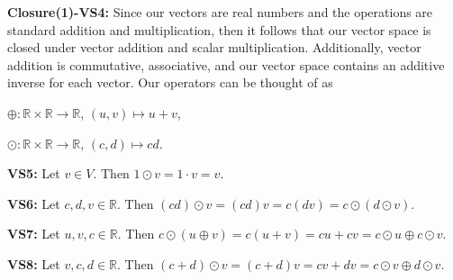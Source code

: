 \documentclass[12pt, a4paper]{article}
\begin{document}
\begin{description}

\item\textbf{Closure(1)-VS4: }Since our vectors are real numbers and the operations are standard addition and multiplication, then it follows that our vector space is closed under vector addition and scalar multiplication. Additionally, vector addition is commutative, associative, and our vector space contains an additive inverse for each vector. Our operators can be thought of as\par

\vspace{2mm}

\centerline{$\oplus\colon\mathbb{R}\times\mathbb{R}\rightarrow\mathbb{R}$, $(u,v)\mapsto u+v$,}

\vspace{2mm}

\centerline{$\odot\colon\mathbb{R}\times\mathbb{R}\rightarrow\mathbb{R}$, $(c,d)\mapsto cd$.}

\item\textbf{VS5:} Let $v\in V$. Then $1\odot v= 1\cdot v=v$.

\item\textbf{VS6:} Let $c,d,v\in\mathbb{R}$. Then $(cd)\odot v=(cd) v=c(dv)=c\odot(d\odot v)$.

\item\textbf{VS7:} Let $u,v,c\in\mathbb{R}$. Then $c\odot(u\oplus v)=c(u+v)=cu+cv=c\odot u\oplus c\odot v$.

\item\textbf{VS8:} Let $v,c,d\in\mathbb{R}$. Then $(c+d)\odot v=(c+d)v=cv+dv=c\odot v\oplus d\odot v$.

\end{description}
\end{document}
